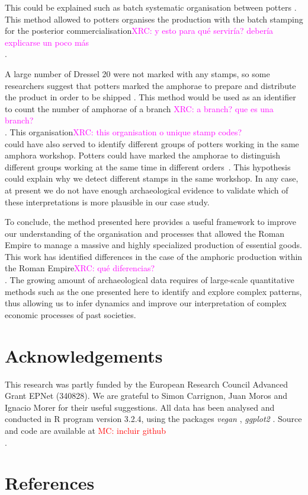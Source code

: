 \documentclass[review]{elsarticle}
\newcommand{\memo}[2]{\textcolor{#1}{#2}}
\newcommand{\maria}[1]{\memo{red}{MC: #1\\}}
\newcommand{\xavi}[1]{\memo{magenta}{XRC: #1\\}}
\begin{document}
This could be explained such as batch systematic organisation between potters \citep{juanmorostesis}. This method allowed to potters organises the production with the batch stamping for the posterior commercialisation\xavi{y esto para qué serviría? debería explicarse un poco más}.

A large number of Dressel 20 were not marked with any stamps, so some researchers suggest that potters marked the amphorae to prepare and distribute the product in order to be shipped \citep{berni_millet_epigrafianforica_2008}. This method would be used as an identifier to count the number of amphorae of a branch \citep{juanmorostesis}\xavi{a branch? que es una branch?}. This organisation\xavi{this organisation o unique stamp codes?} could have also served to identify different groups of potters working in the same amphora workshop. Potters could have marked the amphorae to distinguish different groups working at the same time in different orders~\citep{li_crossbows_2014}. This hypothesis could explain why we detect different stamps in the same workshop. In any case, at present we do not have enough archaeological evidence to validate which of these interpretations is more plausible in our case study.

To conclude, the method presented here provides a useful framework to improve our understanding of the organisation and processes that allowed the Roman Empire to manage a massive and highly specialized production of essential goods.  This work has identified differences in the case of the amphoric production within the Roman Empire\xavi{qué diferencias?}. The growing amount of archaeological data requires of large-scale quantitative methods such as the one presented here to identify and explore complex patterns, thus allowing us to infer dynamics and improve our interpretation of complex economic processes of past societies. 

\section{Acknowledgements}

This research was partly funded by the European Research Council Advanced Grant EPNet (340828). We are grateful to Simon Carrignon, Juan Moros and Ignacio Morer for their useful suggestions.  
All data has been analysed and conducted in R program version 3.2.4, using the packages \textit{vegan} \citep{oksanen_vegan_2007}, \textit{ggplot2} \citep{ggplot2:_2016}. Source and code are available at \maria{incluir github}. 

\section{References}

%

\end{document}
